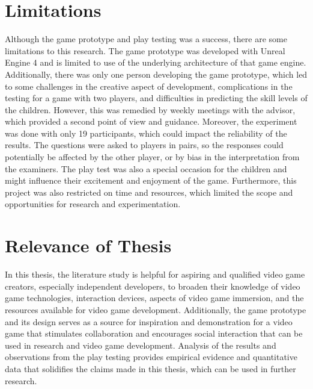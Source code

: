 \section{Limitations}
Although the game prototype and play testing was a success, there are some limitations to this research. The game prototype was developed with Unreal Engine 4 and is limited to use of the underlying architecture of that game engine. Additionally, there was only one person developing the game prototype, which led to some challenges in the creative aspect of development, complications in the testing for a game with two players, and difficulties in predicting the skill levels of the children. However, this was remedied by weekly meetings with the advisor, which provided a second point of view and guidance. Moreover, the experiment was done with only 19 participants, which could impact the reliability of the results. The questions were asked to players in pairs, so the responses could potentially be affected by the other player, or by bias in the interpretation from the examiners. The play test was also a special occasion for the children and might influence their excitement and enjoyment of the game. Furthermore, this project was also restricted on time and resources, which limited the scope and opportunities for research and experimentation.

\section{Relevance of Thesis}
In this thesis, the literature study is helpful for aspiring and qualified video game creators, especially independent developers, to broaden their knowledge of video game technologies, interaction devices, aspects of video game immersion, and the resources available for video game development.
Additionally, the game prototype and its design serves as a source for inspiration and demonstration for a video game that stimulates collaboration and encourages social interaction that can be used in research and video game development.
Analysis of the results and observations from the play testing provides empirical evidence and quantitative data that solidifies the claims made in this thesis, which can be used in further research.



